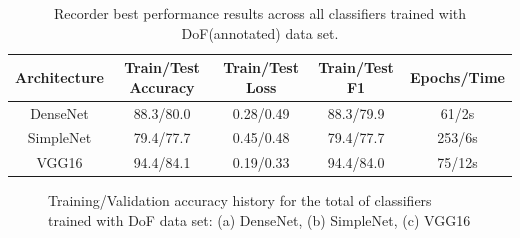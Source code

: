 \begin{table}[ht!]
\centering
\footnotesize
\begin{tabular}{c|c|c|c|c}

\multicolumn{1}{c|}{Architecture} & \multicolumn{1}{c|}{Train/Test Accuracy} & \multicolumn{1}{c|}{Train/Test Loss} & \multicolumn{1}{c|}{Train/Test F1} & Epochs/Time\\ \hline

DenseNet & 88.3/80.0 & 0.28/0.49 & 88.3/79.9 & 61/2s\\

SimpleNet & 79.4/77.7 & 0.45/0.48 & 79.4/77.7 & 253/6s\\
                        
VGG16 & 94.4/84.1 & 0.19/0.33 & 94.4/84.0 & 75/12s\\

\end{tabular}
\caption{Recorder best performance results across all classifiers trained with DoF(annotated) data set.}
\label{c5:dof_results_table}
\end{table}

\begin{figure}[ht!]
    \centering  
    \caption{Training/Validation accuracy history for the total of classifiers trained with DoF data set: (a) DenseNet, (b) SimpleNet, (c) VGG16}
    \label{c5:dof_training_acc_history}
\end{figure}

